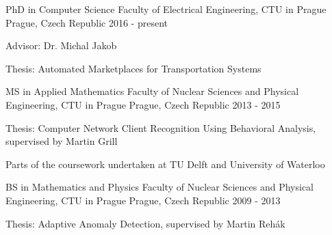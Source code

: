 

\begin{cventries}

  \cventry
    {PhD in Computer Science} %
    {Faculty of Electrical Engineering, CTU in Prague} %
    {Prague, Czech Republic} %
    {2016 - present} %
    {
      \begin{cvitems} %
        \item {Advisor: Dr. Michal Jakob}
        \item {Thesis: Automated Marketplaces for Transportation Systems}
      \end{cvitems}
    }


  \cventry
    {MS in Applied Mathematics} %
    {Faculty of Nuclear Sciences and Physical Engineering, CTU in Prague} %
    {Prague, Czech Republic} %
    {2013 - 2015} %
    {
      \begin{cvitems} %
        \item {Thesis: Computer Network Client Recognition Using Behavioral Analysis, supervised by Martin Grill}
        \item {Parts of the coursework undertaken at TU Delft and University of Waterloo}
      \end{cvitems}
    }

  \cventry
    {BS in Mathematics and Physics} %
    {Faculty of Nuclear Sciences and Physical Engineering, CTU in Prague} %
    {Prague, Czech Republic} %
    {2009 - 2013} %
    {
      \begin{cvitems} %
        \item {Thesis: Adaptive Anomaly Detection, supervised by Martin Rehák }
      \end{cvitems}
    }

\end{cventries}
